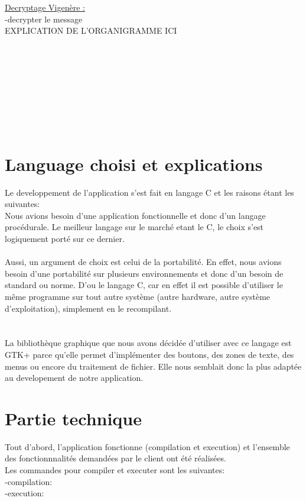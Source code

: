 \documentclass[a4]{article}
\begin{document}
			\underline{Decryptage Vigenère :}\\
			-decrypter le message\\
			

			
			EXPLICATION DE L'ORGANIGRAMME ICI \\ \\ \\ \\ \\ \\ \\ \\ \\
	\section{Language choisi et explications}
	
	Le developpement de l'application s'est fait en langage C et les raisons étant les suivantes: \\
	
Nous avions besoin d'une application fonctionnelle et donc d'un langage procédurale. Le meilleur langage sur le marché
etant le C, le choix s'est logiquement porté sur ce dernier.\\ \\

Aussi, un argument de choix est celui de la portabilité. En effet, nous avions besoin d'une portabilité sur plusieurs
environnements et donc d'un besoin de standard ou norme. D'ou le langage C, car en effet il est possible d'utiliser
 le même programme sur tout autre système
 (autre hardware, autre système d'exploitation), simplement en le recompilant. \\ \\ \\



La bibliothèque graphique que nous avons décidée d'utiliser avec ce langage est GTK+ 
		parce qu'elle permet d'implémenter des boutons, des zones de texte, des menus ou encore du traitement de fichier.
		Elle nous semblait donc la plus adaptée au developement de notre application.
	\section{Partie technique}
	
	Tout d'abord, l'application fonctionne (compilation et execution) et
	l'ensemble des fonctionnnalités demandées par le client ont été réalisées.\\ 
	Les commandes pour compiler et executer sont les suivantes:\\
	-compilation:\\
	-execution:\\ \\
	
\end{document}
